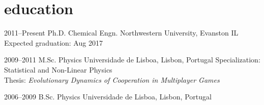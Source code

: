 
\section{education}

\begin{entrylist}


\entry
{2011--Present}
{Ph.D. {\normalfont Chemical Engn.}}
{Northwestern University, Evanston IL}
{Expected graduation: Aug 2017}


\entry
{2009--2011}
{M.Sc. {\normalfont Physics}}
{Universidade de Lisboa, Lisbon, Portugal}
{Specialization: Statistical and Non-Linear Physics\\
Thesis: \textit{Evolutionary Dynamics of Cooperation in Multiplayer Games}}


\entry
{2006--2009}
{B.Sc. {\normalfont Physics}}
{Universidade de Lisboa, Lisbon, Portugal}
{}


\end{entrylist}
